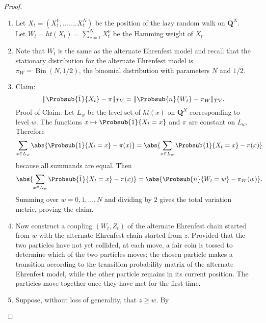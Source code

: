 \documentclass[12pt]{article}
\begin{document}
\begin{proof}
    \begin{enumerate}
        \item
            Let \( X_t = (X_t^1, \dots \dots, X_t^N) \) be the position
            of the lazy random walk on \( \mathbf{Q}^N \).  Let \( W_t =
            ht(X_t) = \sum_{\nu=1}^N X_t^{\nu} \) be the Hamming weight
            of \( X_t \).
        \item
            Note that \( W_t \) is the same as the alternate Ehrenfest
            model and recall that the stationary distribution for the
            alternate Ehrenfest model is \( \pi_W =
            \operatorname{Bin}
            (N,1/2) \), the binomial distribution with parameters \( N \)
            and \( 1/2 \).
        \item
            Claim:
            \[
                \| \Probsub{\bar{1}}{X_t} - \pi \|_{TV} = \| \Probsub{n}
                {W_t} - \pi_W \|_{TV}.
            \] Proof of Claim:  Let \( L_w \) be the level set of \( ht(x)
            \) on \( \mathbf{Q}^N \) corresponding to level \( w \).
            The functions \( x \mapsto \Probsub{\bar{1}}{X_t=x} \) and \(
            \pi \) are constant on \( L_w \). Therefore
            \[
                \sum_{x \in L_w} \abs{ \Probsub{\bar{1}}{X_t = x} - \pi(x)
                } = \abs{\sum_{x \in L_w} \Probsub{\bar{1}}{X_t = x} -
                \pi(x) }
            \] because all summands are equal.  Then
            \[
                \abs{\sum_{x \in L_w} \Probsub{\bar{1}}{X_t = x} - \pi(x)
                } = \abs{ \Probsub{n}{W_t = w} - \pi_W(w) }.
            \] Summing over \( w = 0,1,\dots,N \) and dividing by \( 2 \)
            gives the total variation metric, proving the claim.
        \item
            Now construct a coupling \( (W_t, Z_t) \) of the alternate
            Ehrenfest chain started from \( w \) with the alternate
            Ehrenfest chain started from \( z \).  Provided that the two
            particles have not yet collided, at each move, a fair coin
            is tossed to determine which of the two particles moves; the
            chosen particle makes a transition according to the
            transition probability matrix of the alternate Ehrenfest
            model, while the other particle remains in its current
            position.  The particles move together once they have met
            for the first time.
        \item
            Suppose, without loss of generality, that \( z \ge w \).  By

\end{enumerate}
\end{proof}
\end{document}
